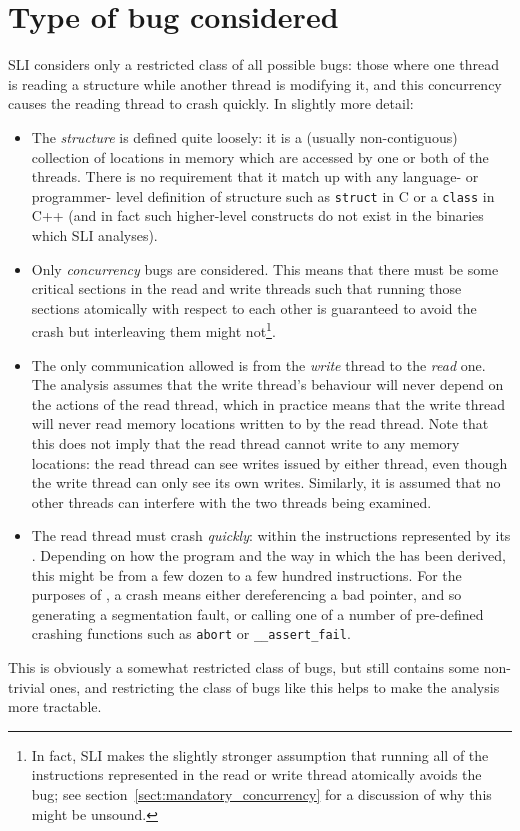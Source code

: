 \section{Type of bug considered}

SLI considers only a restricted class of all possible bugs: those
where one thread is reading a structure while another thread is
modifying it, and this concurrency causes the reading thread to crash
quickly.  In slightly more detail:

\begin{itemize}
\item The \emph{structure} is defined quite loosely: it is a (usually
  non-contiguous) collection of locations in memory which are accessed
  by one or both of the threads.  There is no requirement that it
  match up with any language- or programmer- level definition of
  structure such as \verb|struct| in C or a \verb|class| in C++ (and
  in fact such higher-level constructs do not exist in the binaries
  which SLI analyses).
\item Only \emph{concurrency} bugs are considered.  This means that
  there must be some critical sections in the read and write threads
  such that running those sections atomically with respect to each
  other is guaranteed to avoid the crash but interleaving them might
  not\footnote{In fact, SLI makes the slightly stronger assumption
    that running all of the instructions represented in the read or
    write thread \StateMachines atomically avoids the bug; see
    section~\ref{sect:mandatory_concurrency} for a discussion of why
    this might be unsound.}.  
\item The only communication allowed is from the \emph{write} thread
  to the \emph{read} one.  The analysis assumes that the write
  thread's behaviour will never depend on the actions of the read
  thread, which in practice means that the write thread will never
  read memory locations written to by the read thread.  Note that this
  does not imply that the read thread cannot write to any memory
  locations: the read thread can see writes issued by either thread,
  even though the write thread can only see its own writes.
  Similarly, it is assumed that no other threads can interfere with
  the two threads being examined.
\item The read thread must crash \emph{quickly}: within the
  instructions represented by its \StateMachine.  Depending on how the
  program and the way in which the \StateMachine has been derived,
  this might be from a few dozen to a few hundred instructions.  For
  the purposes of \implementation, a crash means either dereferencing
  a bad pointer, and so generating a segmentation fault, or calling
  one of a number of pre-defined crashing functions such as
  \verb|abort| or \verb|__assert_fail|.
\end{itemize}

This is obviously a somewhat restricted class of bugs, but still
contains some non-trivial ones, and restricting the class of bugs like
this helps to make the analysis more tractable.

